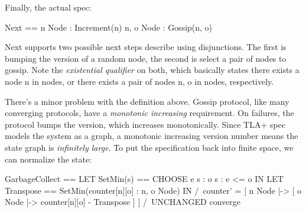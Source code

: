Finally, the actual spec: \newline
\begin{tla}
    Next == \/ \E n \in Node : Increment(n)
            \/ \E n, o \in Node : Gossip(n, o)
\end{tla}
\begin{tlatex}
%
\end{tlatex}
\newline

Next supports two possible next steps describe using disjunctions. The first is
bumping the version of a random node, the second is select a pair of nodes to
gossip. Note the \textit{existential qualifier} on both, which basically states
there exists a node n in nodes, or there exists a pair of nodes n, o in nodes,
respectively.\newline

There's a minor problem with the definition above. Gossip protocol, like many
converging protocols, have a \textit{monotonic increasing} requirement. On
failures, the protocol bumps the version, which increases monotonically. Since
TLA+ spec models the system as a graph, a monotonic increasing version number
means the state graph is \textit{infinitely large}. To put the specification back into
finite space, we can normalize the state:\newline

\begin{tla}
GarbageCollect ==
    LET SetMin(s) == CHOOSE e \in s : \A o \in s : e <= o IN
    LET Transpose == SetMin({counter[n][o] : n, o \in Node}) IN
        /\ counter' = [
            n \in Node |-> [
                o \in Node |-> counter[n][o] - Transpose
            ]
          ]
        /\ UNCHANGED converge
\end{tla}
\begin{tlatex}
%
\@x{\@s{36.79} \.{\land} counter \.{'} \.{=} [}%
\@x{\@s{52.01} n \.{\in} Node \.{\mapsto} [}%
\@x{\@s{52.01} ]}%
\@x{\@s{44.99} ]}%
%
\end{tlatex}
\newline

